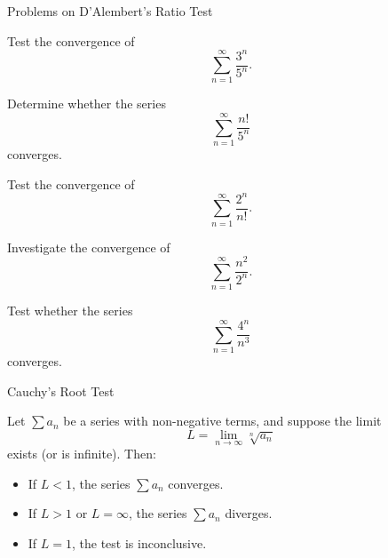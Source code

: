 \documentclass[12pt, a4paper]{article}
\begin{document}
\clearpage

\begin{heading}
    Problems on D'Alembert's Ratio Test
\end{heading}

\begin{problem}
Test the convergence of 
\[
\sum_{n=1}^{\infty} \frac{3^n}{5^n}.
\]
\end{problem}

\clearpage

\begin{problem}
Determine whether the series
\[
\sum_{n=1}^{\infty} \frac{n!}{5^n}
\]
converges.
\end{problem}

\clearpage

\begin{problem}
Test the convergence of 
\[
\sum_{n=1}^{\infty} \frac{2^n}{n!}.
\]
\end{problem}

\clearpage

\begin{problem}
Investigate the convergence of 
\[
\sum_{n=1}^{\infty} \frac{n^2}{2^n}.
\]
\end{problem}

\clearpage

\begin{problem}
Test whether the series 
\[
\sum_{n=1}^{\infty} \frac{4^{n}}{n^3}
\]
converges.
\end{problem}

\clearpage

\begin{heading}
	 Cauchy’s Root Test
\end{heading}

\vspace{10pt}

\begin{theorem}
	Let $\sum a_n$ be a series with non-negative terms, and suppose the limit
	\[
	L = \lim_{n \to \infty} \sqrt[n]{a_n}
	\]
	exists (or is infinite). Then:

	\begin{itemize}
		\item[(i)] If \(L < 1\), the series \(\sum a_n\) converges.
		\item[(ii)] If \(L > 1\) or \(L = \infty\), the series \(\sum a_n\) diverges.
		\item[(iii)] If \(L = 1\), the test is inconclusive.
	\end{itemize}
\end{theorem}
\end{document}

